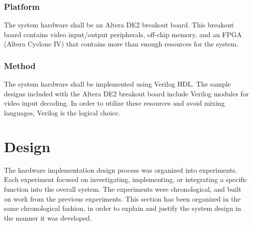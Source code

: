 \documentclass[11pt]{article} %
\begin{document}
\subsubsection{Platform}
The system hardware shall be an Altera DE2 breakout board. This breakout board contains video input/output peripherals, off-chip memory, and an FPGA (Altera Cyclone IV) that contains more than enough resources for the system.
\subsubsection{Method}
The system hardware shall be implemented using Verilog HDL. The sample designs included with the Altera DE2 breakout board include Verilog modules for video input decoding. In order to utilize these resources and avoid mixing languages, Verilog is the logical choice.
\section{Design}
The hardware implementation design process was organized into experiments. Each experiment focused on investigating, implementing, or integrating a specific function into the overall system. The experiments were chronological, and built on work from the previous experiments. This section has been organized in the same chronological fashion, in order to explain and justify the system design in the manner it was developed.
\end{document}
